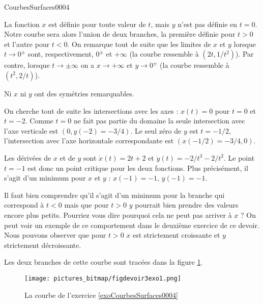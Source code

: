 \begin{corrige}{CourbesSurfaces0004}

La fonction $x$ est définie pour toute valeur de $t$, mais $y$ n'est pas définie en $t=0$. Notre courbe sera alors l'union de deux branches, la première définie pour $t>0$ et l'autre pour $t<0$. On remarque tout de suite que les limites de $x$ et $y$ lorsque $t\to 0^{\pm}$ sont, respectivement, $0^\pm$ et $+\infty$ (la courbe ressemble à $(2t, 1/t^2)$). Par contre, lorsque $t\to \pm\infty$ on a $x\to +\infty$ et $y\to 0^\pm$ (la courbe ressemble à $(t^2, 2/t)$). 

Ni $x$ ni $y$ ont des symétries remarquables. 

On cherche tout de suite les intersections avec les axes : $x(t)=0$ pour $t=0$ et $t=-2$. Comme $t=0$ ne fait pas partie du domaine la seule intersection avec l'axe verticale est $(0, y(-2)=-3/4)$. Le seul zéro de $y$ est $t=-1/2$, l'intersection avec l'axe horizontale correspondante est $(x(-1/2)=-3/4,0)$. 

Les dérivées de $x$ et de $y$ sont $\dot x (t)= 2t+2 $ et $\dot y(t)= -2/t^3-2/t^2$. Le point $t=-1$ est donc un point critique pour les deux fonctions. Plus précisément, il s'agit d'un minimum pour $x$ et $y$ : $x(-1)=-1$, $y(-1)= -1$.

 Il faut bien comprendre qu'il s'agit  d'un minimum pour la branche qui correspond à  $t<0$ mais que pour $t>0$ $y$ pourrait bien prendre des valeurs encore plus petits. Pourriez vous dire pourquoi cela ne peut pas arriver à $x$ ? On peut voir un exemple de ce comportement dans le deuxième exercice de ce devoir.   
Nous pouvons observer que pour $t>0$ $x$ est strictement croissante et $y$ strictement décroissante. 

Les deux branches de cette courbe sont tracées dans la figure \ref{figdevoir3exo1}.

\begin{figure}
  \begin{center}
    \texttt{[image: pictures\_bitmap/figdevoir3exo1.png]}

  \caption{La courbe de l'exercice \ref{exoCourbesSurfaces0004}}\label{figdevoir3exo1}
  \end{center}
 \end{figure}
\end{corrige}
